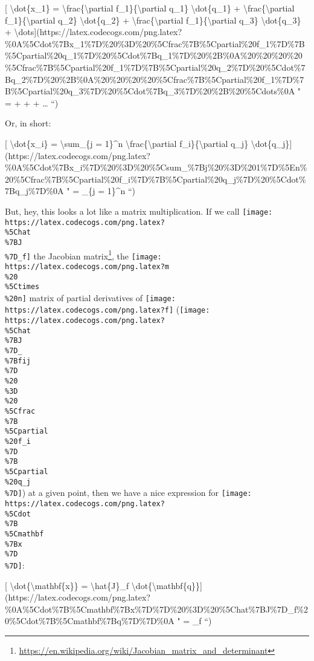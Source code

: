\documentclass[]{article}
\renewcommand{\href}[2]{#2\footnote{\url{#1}}}
\begin{document}
{[} \textbackslash{}dot\{x\_1\} = \textbackslash{}frac\{\textbackslash{}partial
f\_1\}\{\textbackslash{}partial q\_1\} \textbackslash{}dot\{q\_1\} +
\textbackslash{}frac\{\textbackslash{}partial f\_1\}\{\textbackslash{}partial
q\_2\} \textbackslash{}dot\{q\_2\} +
\textbackslash{}frac\{\textbackslash{}partial f\_1\}\{\textbackslash{}partial
q\_3\} \textbackslash{}dot\{q\_3\} +
\textbackslash{}dots{]}(https://latex.codecogs.com/png.latex?\%0A\%5Cdot\%7Bx\_1\%7D\%20\%3D\%20\%5Cfrac\%7B\%5Cpartial\%20f\_1\%7D\%7B\%5Cpartial\%20q\_1\%7D\%20\%5Cdot\%7Bq\_1\%7D\%20\%2B\%0A\%20\%20\%20\%20\%5Cfrac\%7B\%5Cpartial\%20f\_1\%7D\%7B\%5Cpartial\%20q\_2\%7D\%20\%5Cdot\%7Bq\_2\%7D\%20\%2B\%0A\%20\%20\%20\%20\%5Cfrac\%7B\%5Cpartial\%20f\_1\%7D\%7B\%5Cpartial\%20q\_3\%7D\%20\%5Cdot\%7Bq\_3\%7D\%20\%2B\%20\%5Cdots\%0A
"  =   +
  + 
 + \dots
``)

Or, in short:

{[} \textbackslash{}dot\{x\_i\} = \textbackslash{}sum\_\{j = 1\}\^{}n
\textbackslash{}frac\{\textbackslash{}partial f\_i\}\{\textbackslash{}partial
q\_j\}
\textbackslash{}dot\{q\_j\}{]}(https://latex.codecogs.com/png.latex?\%0A\%5Cdot\%7Bx\_i\%7D\%20\%3D\%20\%5Csum\_\%7Bj\%20\%3D\%201\%7D\%5En\%20\%5Cfrac\%7B\%5Cpartial\%20f\_i\%7D\%7B\%5Cpartial\%20q\_j\%7D\%20\%5Cdot\%7Bq\_j\%7D\%0A
"  = \sum\_\{j = 1\}\^{}n  
``)

But, hey, this looks a lot like a matrix multiplication. If we call
\texttt{[image: https://latex.codecogs.com/png.latex?\\\%5Chat\\\%7BJ\\\%7D\_f]} the
\href{https://en.wikipedia.org/wiki/Jacobian_matrix_and_determinant}{Jacobian
matrix}, the
\texttt{[image: https://latex.codecogs.com/png.latex?m\\\%20\\\%5Ctimes\\\%20n]}
matrix of partial derivatives of
\texttt{[image: https://latex.codecogs.com/png.latex?f]}
(\texttt{[image: https://latex.codecogs.com/png.latex?\\\%5Chat\\\%7BJ\\\%7D\_\\\%7Bfij\\\%7D\\\%20\\\%3D\\\%20\\\%5Cfrac\\\%7B\\\%5Cpartial\\\%20f\_i\\\%7D\\\%7B\\\%5Cpartial\\\%20q\_j\\\%7D]})
at a given point, then we have a nice expression for
\texttt{[image: https://latex.codecogs.com/png.latex?\\\%5Cdot\\\%7B\\\%5Cmathbf\\\%7Bx\\\%7D\\\%7D]}:

{[} \textbackslash{}dot\{\textbackslash{}mathbf\{x\}\} =
\textbackslash{}hat\{J\}\_f
\textbackslash{}dot\{\textbackslash{}mathbf\{q\}\}{]}(https://latex.codecogs.com/png.latex?\%0A\%5Cdot\%7B\%5Cmathbf\%7Bx\%7D\%7D\%20\%3D\%20\%5Chat\%7BJ\%7D\_f\%20\%5Cdot\%7B\%5Cmathbf\%7Bq\%7D\%7D\%0A
"  = \_f  ``)
\end{document}
